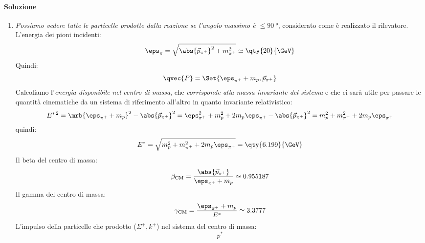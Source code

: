 \begin{example}
	\paragraph{Soluzione}
	\begin{enumerate}
		\item \textit{Possiamo vedere tutte le particelle prodotte dalla reazione
			      se l'angolo massimo è $\leq \qty{90}{\degree}$}, considerato come è
		      realizzato il rilevatore. L'energia dei pioni incidenti:
		      \begin{equation}
			      \eps _{\pi} = \sqrt{\abs{\vec{p}_{\pi^+}}^{2} + m _{\pi^+}^{2}}
			      \simeq \qty{20}{\GeV}
		      \end{equation}
		      Quindi:
		      \begin{equation}
			      \qvec{P} = \Set{\eps _{\pi^+} + m _{p}, \vec{p}_{\pi^+}}
		      \end{equation}
		      Calcoliamo l'\textit{energia disponibile nel centro di massa}, che
		      \textit{corrisponde alla massa invariante del sistema} e che ci sarà
		      utile per passare le quantità cinematiche da un sistema di
		      riferimento all'altro in quanto invariante relativistico:
		      \begin{equation}
			      E ^{\ast\,2}
			      = \mrb{\eps _{\pi^+} + m _{p}}^{2} - \abs{\vec{p} _{\pi^+}}^{2}
			      = \eps _{\pi^+}^{2} + m _{p}^{2} + 2 m_p \eps _{\pi^+} -
			      \abs{\vec{p} _{\pi^+}}^{2}
			      = m _{p}^{2} + m _{\pi^+}^{2} + 2 m_p \eps _{\pi^+}
		      \end{equation}
		      quindi:
		      \begin{equation}
			      E^\ast
			      = \sqrt{m _{p}^{2} + m _{\pi^+}^{2} + 2 m_p \eps _{\pi^+}}
			      = \qty{6.199}{\GeV}
		      \end{equation}
		      Il beta del centro di massa:
		      \begin{equation}
			      \beta _{\text{CM}}
			      = \frac{\abs{\vec{p}_{\pi^+}}}{\eps _{\pi^+} + m _{p}}
			      \simeq 0.955187
		      \end{equation}
		      Il gamma del centro di massa:
		      \begin{equation}
			      \gamma _{\text{CM}}
			      = \frac{\eps _{\pi^+} + m _{p}}{E^\ast}
			      \simeq 3.3777
		      \end{equation}
          L'impulso della particelle che prodotto ($\Sigma^+, k^+$) nel sistema
		      del centro di massa:
		      \begin{equation}
			      p^\ast

\end{equation}
\end{enumerate}
\end{example}
